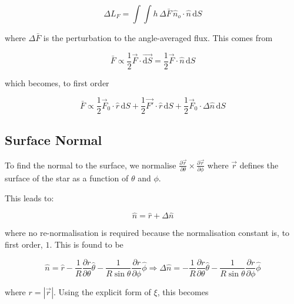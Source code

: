 \documentclass[11pt]{amsart}
\begin{document}
\begin{equation}
\Delta L_{F} = \int \int h \, \Delta \bar{F} \, \hat{n}_{o} \! \cdot \! \hat{n} \, \text{d}S
\end{equation}

where $\Delta \bar{F}$ is the perturbation to the angle-averaged flux.  This comes from

\begin{equation}
\bar{F} \propto \frac{1}{2} \vec{F} \! \cdot \! \vec{\text{d}S} = \frac{1}{2} \vec{F} \! \cdot \! \hat{n} \, \text{d}S
\end{equation}

which becomes, to first order

\begin{equation}
\bar{F} \propto \frac{1}{2} \vec{F}_{0} \! \cdot \! \hat{r} \, \text{d}S  +  \frac{1}{2} \vec{F'} \! \cdot \! \hat{r} \, \text{d}S  +  \frac{1}{2} \vec{F}_{0} \! \cdot \! \Delta \hat{n} \, \text{d}S
\end{equation}



\subsection{Surface Normal} \label{Lum:Norm}

To find the normal to the surface, we normalise $\frac{\partial \vec{r}}{\partial \theta} \times \frac{\partial \vec{r}}{\partial \phi}$ where $\vec{r}$ defines the surface of the star as a function of $\theta$ and $\phi$.

This leads to:

\begin{equation}
\hat{n} = \hat{r} + \Delta \hat{n}
\end{equation}

where no re-normalisation is required because the normalisation constant is, to first order, $1$.  This is found to be

\begin{equation}
\hat{n} = \hat{r} - \frac{1}{R} \frac{\partial r}{\partial \theta} \hat{\theta} - \frac{1}{R \sin \theta} \frac{\partial r}{\partial \phi} \hat{\phi}   \Longrightarrow  \Delta \hat{n} =  - \frac{1}{R} \frac{\partial r}{\partial \theta} \hat{\theta} - \frac{1}{R \sin \theta} \frac{\partial r}{\partial \phi} \hat{\phi} 
\end{equation}

where $r = |\vec{r}|$.  Using the explicit form of $\xi$, this becomes
\end{document}
